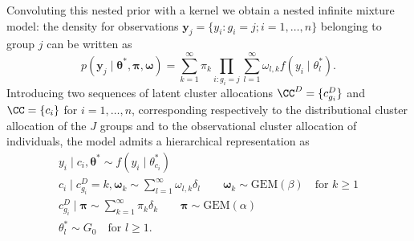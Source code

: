 Convoluting this nested prior with a kernel we obtain a nested infinite mixture model: the density for observations $\bm{y}_j = \{y_i : g_i = j; i=1,\dots,n\}$ belonging to group $j$ can be written as
\begin{equation*}
p(\bm{y}_j \mid \bm{\theta}^*, \bm{\pi}, \bm{\omega}) = \sum_{k=1}^{\infty} \pi_k \prod_{i:g_i=j} \sum_{l=1}^{\infty} \omega_{l,k} f(y_i\mid\theta^*_l).
\end{equation*}
Introducing two sequences of latent cluster allocations $\CC^D=\{c^D_{g_i}\}$ and $\CC = \{c_{i}\}$ for $i = 1,\dots,n$, corresponding respectively to the distributional cluster allocation of the $J$ groups and to the observational cluster allocation of individuals, the model admits a hierarchical representation as
\begin{equation*}
\begin{gathered}
y_i\mid  c_{i}, \bm{\theta}^* \sim f(y_i\mid \theta^*_{c_{i}})\\
c_i \mid c^D_{g_i} = k, \bm{\omega}_k \sim \sum_{l=1}^{\infty} \omega_{l,k} \delta_l \qquad 
\bm{\omega}_k \sim \mathrm{GEM}(\beta) \quad \text{for } k\geq1\\
c^D_{g_i} \mid \bm{\pi} \sim \sum_{k=1}^{\infty} \pi_k \delta_k \qquad \bm{\pi} \sim \mathrm{GEM}(\alpha) \\
\theta^*_l \sim G_0 \quad\text{for }l\geq 1.
\end{gathered}
\end{equation*}

